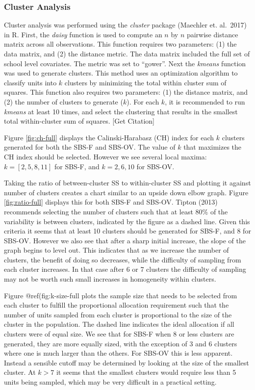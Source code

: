 \documentclass[,man]{apa6}
\theoremstyle{definition}
\theoremstyle{definition}
\theoremstyle{definition}
\theoremstyle{remark}
\begin{document}
\hypertarget{cluster-analysis-1}{%
\subsubsection{Cluster Analysis}\label{cluster-analysis-1}}

Cluster analysis was performed using the \emph{cluster} package
(Maechler et. al.~2017) in R. First, the \emph{daisy} function is used
to compute an \(n\) by \(n\) pairwise distance matrix across all
observations. This function requires two parameters: (1) the data
matrix, and (2) the distance metric. The data matrix included the full
set of school level covariates. The metric was set to \enquote{gower}.
Next the \emph{kmeans} function was used to generate clusters. This
method uses an optimization algorithm to classify units into \(k\)
clusters by minimizing the total within cluster sum of squares. This
function also requires two parameters: (1) the distance matrix, and (2)
the number of clusters to generate (\(k\)). For each \(k\), it is
recommended to run \emph{kmeans} at least 10 times, and select the
clustering that results in the smallest total within-cluster sum of
squares. {[}Get Citation{]}

Figure \ref{fig:ch-full} displays the Calinski-Harabasz (CH) index for
each \(k\) clusters generated for both the SBS-F and SBS-OV. The value
of \(k\) that maximizes the CH index should be selected. However we see
several local maxima: \(k = [2, 5, 8, 11]\) for SBS-F, and
\(k = 2, 6, 10\) for SBS-OV.

Taking the ratio of between-cluster SS to within-cluster SS and plotting
it against number of clusters creates a chart similar to an upside down
elbow graph. Figure \ref{fig:ratio-full} displays this for both SBS-F
and SBS-OV. Tipton (2013) recommends selecting the number of clusters
such that at least 80\% of the variability is between clusters,
indicated by the figure as a dashed line. Given this criteria it seems
that at least 10 clusters should be generated for SBS-F, and 8 for
SBS-OV. However we also see that after a sharp initial increase, the
slope of the graph begins to level out. This indicates that as we
increase the number of clusters, the benefit of doing so decreases,
while the difficulty of sampling from each cluster increases. In that
case after 6 or 7 clusters the difficulty of sampling may not be worth
such small increases in homogeneity within clusters.

Figure @ref(fig:k-size-full plots the sample size that needs to be
selected from each cluster to fulfill the proportional allocation
requirement such that the number of units sampled from each cluster is
proportional to the size of the cluster in the population. The dashed
line indicates the ideal allocation if all clusters were of equal size.
We see that for SBS-F when 8 or less clusters are generated, they are
more equally sized, with the exception of 3 and 6 clusters where one is
much larger than the others. For SBS-OV this is less apparent. Instead a
sensible cutoff may be determined by looking at the size of the smallest
cluster. At \(k > 7\) it seems that the smallest clusters would require
less than 5 units being sampled, which may be very difficult in a
practical setting.
\end{document}
